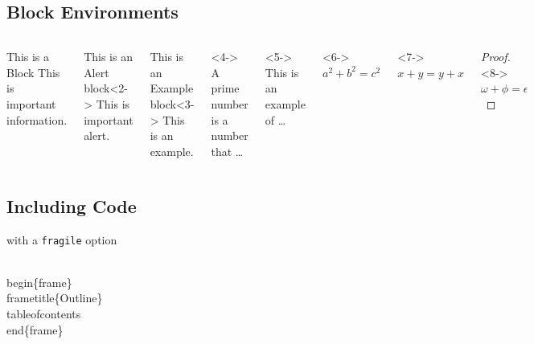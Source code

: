 \documentclass[
        ]{beamer}
\begin{document}
\subsection{Block Environments}
\begin{frame}[t]{\subsecname} %
    \begin{columns}
        \begin{block}{This is a Block}
            This is important information.
        \end{block}
        \begin{alertblock}{This is an Alert block}<2->
            This is important alert.
        \end{alertblock}
        \begin{exampleblock}{This is an Example block}<3->
            This is an example.
        \end{exampleblock}
        \begin{definition}<4->
            A prime number is a number that \ldots
        \end{definition}
        \begin{example}<5->
            This is an example of \ldots
        \end{example}
        \begin{theorem}<6->
            $ a^2 + b^2 = c^2 $
        \end{theorem}
        \begin{corollary}<7->
            $ x + y = y + x $
        \end{corollary}
        \begin{proof}<8->
            $\omega +\phi = \epsilon $
        \end{proof}
    \end{columns}
\end{frame}

\subsection{Including Code}
\begin{frame}[fragile]{\subsecname with a \texttt{fragile} option} %
    \begin{semiverbatim}
\\begin\{frame\}
\\frametitle\{Outline\}
\\tableofcontents
\\end\{frame\}
    \end{semiverbatim}
\end{frame}
\end{document}

